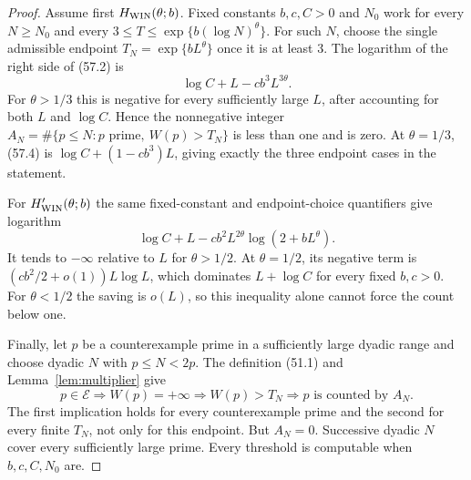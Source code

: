 \documentclass[10pt,reqno]{amsart}
\theoremstyle{definition}
\newcommand{\1}{\mathbf 1}
\begin{document}
\begin{proof}
Assume first $H_{\rm WIN}(\theta;b)$.  Fixed constants $b,c,C>0$ and $N_0$
work for every $N\geq N_0$ and every
$3\leq T\leq\exp\{b(\log N)^\theta\}$.  For such $N$, choose the single
admissible endpoint $T_N=\exp\{bL^\theta\}$ once it is at least 3.  The
logarithm of the right side of (57.2) is
\begin{equation}\tag{57.4}
                    \log C+L-cb^3L^{3\theta}.
\end{equation}
For $\theta>1/3$ this is negative for every sufficiently large $L$, after
accounting for both $L$ and $\log C$.  Hence the nonnegative integer
$A_N=\#\{p\leq N:p\text{ prime},\ W(p)>T_N\}$ is less than one and is zero.
At $\theta=1/3$, (57.4) is $\log C+(1-cb^3)L$, giving exactly the three
endpoint cases in the statement.

For $H'_{\rm WIN}(\theta;b)$ the same fixed-constant and endpoint-choice
quantifiers give logarithm
\begin{equation}\tag{57.5}
 \log C+L-cb^2L^{2\theta}\log(2+bL^\theta).
\end{equation}
It tends to $-\infty$ relative to $L$ for $\theta>1/2$.  At
$\theta=1/2$, its negative term is
$(cb^2/2+o(1))L\log L$, which dominates $L+\log C$ for every fixed
$b,c>0$.  For $\theta<1/2$ the saving is $o(L)$, so this inequality alone
cannot force the count below one.

Finally, let $p$ be a counterexample prime in a sufficiently large dyadic
range and choose dyadic $N$ with $p\leq N<2p$.  The definition (51.1) and
Lemma~\ref{lem:multiplier} give
\[
 p\in\mathcal E\Longrightarrow W(p)=+\infty
 \Longrightarrow W(p)>T_N\Longrightarrow p\text{ is counted by }A_N.
\]
The first implication holds for every counterexample prime and the second
for every finite $T_N$, not only for this endpoint.  But $A_N=0$.
Successive dyadic $N$ cover every sufficiently large prime.  Every threshold
is computable when $b,c,C,N_0$ are.
\end{proof}
\end{document}

